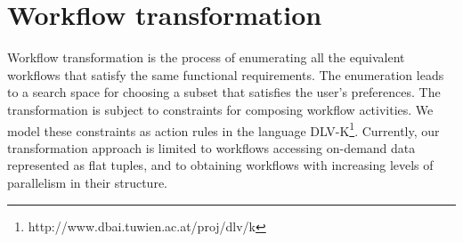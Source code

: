 

\section{Workflow transformation} \label{sec:queryWorkflowGen}

Workflow transformation is the process of enumerating all the equivalent workflows that satisfy the same functional requirements. The enumeration leads to a search space for choosing a subset that satisfies the user's preferences. The transformation is subject to constraints for composing workflow activities. We model these constraints as action rules in the language DLV-K\footnote{http://www.dbai.tuwien.ac.at/proj/dlv/k}. Currently, our transformation approach is limited to workflows accessing on-demand data represented as flat tuples, and to obtaining workflows with increasing levels of parallelism in their structure.

